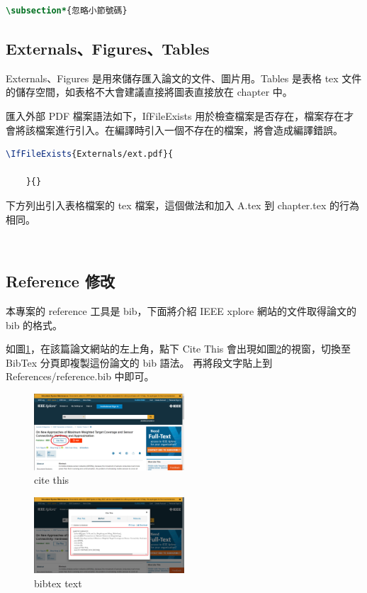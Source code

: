 \begin{lstlisting}[language=TeX]
    \subsection*{忽略小節號碼}
\end{lstlisting}

\subsection*{Externals、Figures、Tables}

Externals、Figures 是用來儲存匯入論文的文件、圖片用。Tables 是表格 tex 文件的儲存空間，如表格不大會建議直接將圖表直接放在 chapter 中。

匯入外部 PDF 檔案語法如下，IfFileExists 用於檢查檔案是否存在，檔案存在才會將該檔案進行引入。在編譯時引入一個不存在的檔案，將會造成編譯錯誤。
\begin{lstlisting}[language=TeX]
    \IfFileExists{Externals/ext.pdf}{
        
    }{}
\end{lstlisting}

下方列出引入表格檔案的 tex 檔案，這個做法和加入 A.tex 到 chapter.tex 的行為相同。
\begin{lstlisting}[language=TeX]
    
\end{lstlisting}

\subsection*{Reference 修改}

本專案的 reference 工具是 bib，下面將介紹 IEEE xplore 網站的文件取得論文的 bib 的格式。

如圖\ref{fig_bib_1}，在該篇論文網站的左上角，點下 Cite This 會出現如圖\ref{fig_bib_2}的視窗，切換至 BibTex 分頁即複製這份論文的 bib 語法。
再將段文字貼上到 References/reference.bib 中即可。

\begin{figure}[H] 
    \centering 
    \includegraphics[width=0.5\textwidth]{./Figures/how_to_used/ieee_xplore_cite_this_bib_01.png} 
    \caption{cite this}
    \label{fig_bib_1}
\end{figure}

\begin{figure}[H] 
    \centering 
    \includegraphics[width=0.5\textwidth]{./Figures/how_to_used/ieee_xplore_cite_this_bib_02.png} 
    \caption{bibtex text}
    \label{fig_bib_2}
\end{figure}
